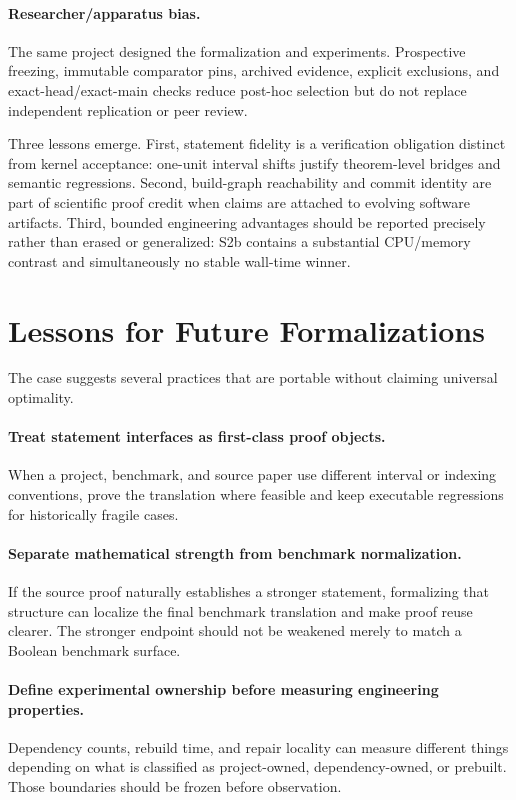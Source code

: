 \documentclass[sigplan,10pt,anonymous,review]{acmart}
\begin{document}
\paragraph{Researcher/apparatus bias.}
The same project designed the formalization and experiments. Prospective freezing, immutable comparator pins, archived evidence, explicit exclusions, and exact-head/exact-main checks reduce post-hoc selection but do not replace independent replication or peer review.

Three lessons emerge. First, statement fidelity is a verification obligation distinct from kernel acceptance: one-unit interval shifts justify theorem-level bridges and semantic regressions. Second, build-graph reachability and commit identity are part of scientific proof credit when claims are attached to evolving software artifacts. Third, bounded engineering advantages should be reported precisely rather than erased or generalized: S2b contains a substantial CPU/memory contrast and simultaneously no stable wall-time winner.


\section{Lessons for Future Formalizations}
The case suggests several practices that are portable without claiming universal optimality.

\paragraph{Treat statement interfaces as first-class proof objects.}
When a project, benchmark, and source paper use different interval or indexing conventions, prove the translation where feasible and keep executable regressions for historically fragile cases.

\paragraph{Separate mathematical strength from benchmark normalization.}
If the source proof naturally establishes a stronger statement, formalizing that structure can localize the final benchmark translation and make proof reuse clearer. The stronger endpoint should not be weakened merely to match a Boolean benchmark surface.

\paragraph{Define experimental ownership before measuring engineering properties.}
Dependency counts, rebuild time, and repair locality can measure different things depending on what is classified as project-owned, dependency-owned, or prebuilt. Those boundaries should be frozen before observation.
\end{document}
